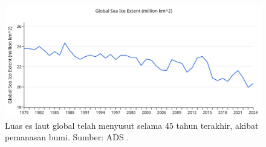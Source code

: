\documentclass[10pt,twocolumn,letterpaper]{article}
\begin{document}
\begin{figure}[t]
\begin{center}
\includegraphics[width=1\textwidth]{ice.jpg}
\end{center}
   \caption{Luas es laut global telah menyusut selama 45 tahun terakhir, akibat pemanasan bumi. Sumber: ADS \cite{149}.}
\label{fig:24}
\end{figure}

\clearpage
\twocolumn

{\small


}
\end{document}
